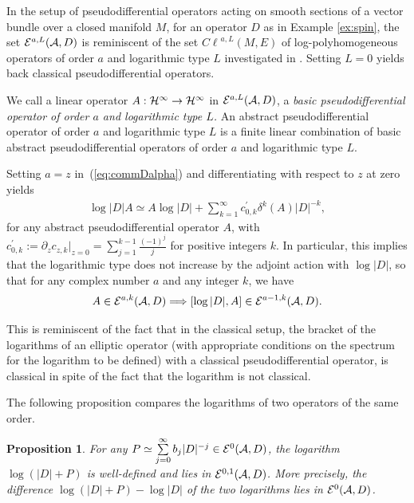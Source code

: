 \documentclass[11pt]{article}
\newtheorem{proposition}{Proposition}
\def \Cl {{C\ell}}
\numberwithin{equation}{section}
\begin{document}
 \begin{remark} In the setup of pseudodif\/ferential
 operators acting on smooth sections of a vector bundle over a closed manifold
 $M$, for an operator $D$ as in Example \ref{ex:spin}, the set ${\cal E}^{a,
 L}({\cal A}, D)$ is reminiscent of the set $\Cl^{a,L}(M,E)$ of
 log-polyhomogeneous operators of order $a$ and logarithmic type $L$
 investigated in \cite{L}. Setting $L=0$ yields back classical
 pseudodif\/ferential operators.
 \end{remark}
We call  a linear operator $A: {\cal
   H}^\infty \to {\cal H}^\infty$ in ${\cal E}^{a, L}({\cal A}, D)$,  a {\it   basic    pseudodif\/ferential
   opera\-tor of order
 $a$ and   logarithmic  type $L$.} An abstract pseudodif\/ferential operator of
 order $a$ and logarithmic type $L$ is a f\/inite linear combination of basic
 abstract pseudodif\/ferential operators of order $a$ and logarithmic type $L$.


 Setting $a=z$ in~(\ref{eq:commDalpha}) and dif\/ferentiating with respect to $z$
 at zero yields
\begin{gather*}  \log \vert D\vert   A\simeq A   \log \vert D\vert +
 \sum_{k=1}^\infty c^\prime_{0,k}
\delta^k(A)   \vert D\vert^{-k},
\end{gather*}
for any abstract pseudodif\/ferential operator $A$,
with
$c^\prime_{0, k}:=\partial_z c_{ z, k}\vert_{z=0}=
\sum\limits_{j=1}^{k-1}\frac{(-1)^j}{j}$ for positive integers $k$. In particular,
this implies that the logarithmic type does not increase
 by the adjoint action with $ \log \vert D\vert$,
 so that for any complex number $a$ and any integer $k$,  we have
\begin{gather}\label{eq:commDalphalog}
A\in {\cal E}^{a,k}({\cal A}, D)\Longrightarrow [ \log \vert D\vert,    A ]
\in {\cal E}^{a-1,k}({\cal A}, D).
\end{gather}
\begin{remark}
  This  is reminiscent of   the  fact that in the classical setup,
  the  bracket of the logarithms of an elliptic operator
   (with appropriate conditions on the spectrum for the logarithm to
    be def\/ined) with a classical pseudodif\/ferential operator, is
    classical in spite of the fact that the   logarithm is not classical.
    \end{remark}

     The following proposition compares  the logarithms
   of two operators of the  same order.
\begin{proposition}\label{prop:differencelog}
For any $P\simeq \sum\limits_{j=0}^\infty b_j   \vert D\vert^{-j}
\in {\cal E}^0({\cal A}, D)$, the logarithm $\log
  (\vert D\vert+P)$ is well-defined and  lies in
${\cal E}^{0,1}({\cal A}, D)$. More precisely, the difference
 $\log   (\vert D\vert+P) -\log  \vert D\vert $ of the
  two logarithms lies  in ${\cal E}^0({\cal A}, D)$.
\end{proposition}
\end{document}

